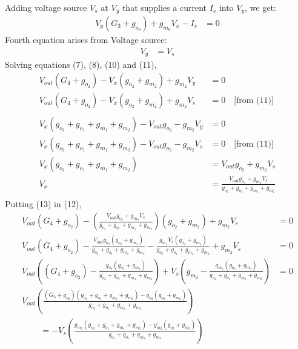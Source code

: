 \begin{enumerate}
\begin{align*}
    \end{align*}
    Adding voltage source $V_s$ at $V_y$ that supplies
    a current $I_s$ into $V_y$, we get:
    \begin{align*}
      V_{y}(G_3 + g_{o_0}) + g_{m_0}V_{x} - I_{s} &= 0 \tag{10}
    \end{align*}
    Fourth equation arises from Voltage source:
    \begin{align*}
      V_{y} &= V_{s} \tag{11}
    \end{align*}
    Solving equations (7), (8), (10) and (11),
    \begin{align*}
      V_{out}(G_4 + g_{o_2}) - V_{x}(g_{o_2} + g_{m_2}) + g_{m_2}V_{y} &= 0 \\
      V_{out}(G_4 + g_{o_2}) - V_{x}(g_{o_2} + g_{m_2}) + g_{m_2}V_{s} &= 0 \quad \text{[from (11)]} \tag{12} \\
      \\
      V_{x}(g_{o_2} + g_{o_1} + g_{m_1} + g_{m_2}) - V_{out}g_{o_2} - g_{m_2}V_{y} &= 0 \\
      V_{x}(g_{o_2} + g_{o_1} + g_{m_1} + g_{m_2}) - V_{out}g_{o_2} - g_{m_2}V_{s} &= 0 \quad \text{[from (11)]} \\
      V_{x}(g_{o_2} + g_{o_1} + g_{m_1} + g_{m_2}) &= V_{out}g_{o_2} + g_{m_2}V_{s} \\
      V_{x} &= \frac{V_{out}g_{o_2} + g_{m_2}V_{s}}{g_{o_2} + g_{o_1} + g_{m_1} + g_{m_2}} \tag{13} \\
    \end{align*}
    Putting (13) in (12),
    \begin{align*}
      V_{out}(G_4 + g_{o_2}) - \left(\frac{V_{out}g_{o_2} + g_{m_2}V_{s}}{g_{o_2} + g_{o_1} + g_{m_1} + g_{m_2}}\right)(g_{o_2} + g_{m_2}) + g_{m_2}V_{s} &= 0 \\
      V_{out}(G_4 + g_{o_2}) - \frac{V_{out}g_{o_2}(g_{o_2} + g_{m_2})}{g_{o_2} + g_{o_1} + g_{m_1} + g_{m_2}} - \frac{g_{m_2}V_{s}(g_{o_2} + g_{m_2})}{g_{o_2} + g_{o_1} + g_{m_1} + g_{m_2}} + g_{m_2}V_{s} &= 0 \\
      V_{out}\left((G_4 + g_{o_2}) - \frac{g_{o_2}(g_{o_2} + g_{m_2})}{g_{o_2} + g_{o_1} + g_{m_1} + g_{m_2}}\right) + V_{s}\left(g_{m_2} - \frac{g_{m_2}(g_{o_2} + g_{m_2})}{g_{o_2} + g_{o_1} + g_{m_1} + g_{m_2}}\right) &= 0 \\
      V_{out}\left(\frac{(G_4 + g_{o_2})(g_{o_2} + g_{o_1} + g_{m_1} + g_{m_2}) - g_{o_2}(g_{o_2} + g_{m_2})}{g_{o_2} + g_{o_1} + g_{m_1} + g_{m_2}}\right) \\ \qquad \, = -V_{s}\left(\frac{g_{m_2}(g_{o_2} + g_{o_1} + g_{m_1} + g_{m_2}) - g_{m_2}(g_{o_2} + g_{m_2})}{g_{o_2} + g_{o_1} + g_{m_1} + g_{m_2}}\right) \\

\end{align*}
\end{enumerate}
